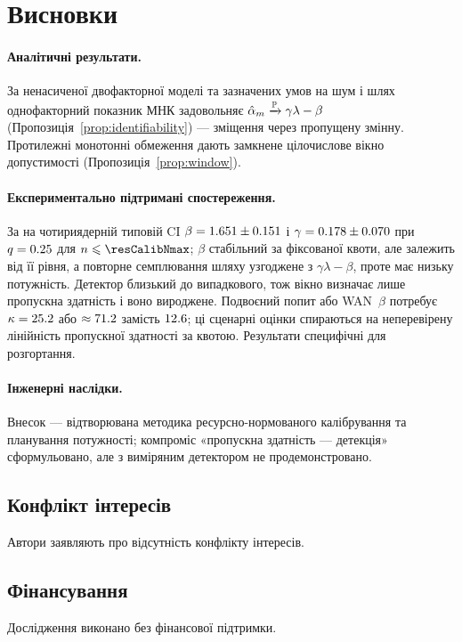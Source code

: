 \section{Висновки}
\label{sec:conclusions}

\paragraph{Аналітичні результати.}
За ненасиченої двофакторної моделі та зазначених умов на шум і шлях
однофакторний показник МНК задовольняє
$\hat{\alpha}_{m}\xrightarrow{\mathbb{P}}\gamma\lambda-\beta$
(Пропозиція~\ref{prop:identifiability}) --- зміщення через пропущену змінну.
Протилежні монотонні обмеження дають замкнене цілочислове вікно допустимості
(Пропозиція~\ref{prop:window}).

\paragraph{Експериментально підтримані спостереження.}
За \RNM{} на чотириядерній типовій CI $\beta=1.651\pm0.151$ і
$\gamma=0.178\pm0.070$ при $q=0.25$ для $\n\le\resCalibNmax$; $\beta$
стабільний за
фіксованої квоти, але залежить від її рівня, а повторне семплювання шляху
узгоджене з $\gamma\lambda-\beta$, проте має низьку потужність. Детектор
близький до випадкового, тож вікно визначає лише пропускна здатність і воно
вироджене. Подвоєний попит або WAN~$\beta$ потребує
$\kappa=25.2$ або $\approx71.2$ замість
$12.6$; ці сценарні оцінки спираються на неперевірену лінійність
пропускної здатності за квотою. Результати специфічні для розгортання.

\paragraph{Інженерні наслідки.}
Внесок --- відтворювана методика ресурсно-нормованого калібрування та
планування потужності; компроміс «пропускна здатність --- детекція»
сформульовано, але з виміряним детектором не продемонстровано.

\subsection*{Конфлікт інтересів}
Автори заявляють про відсутність конфлікту інтересів.

\subsection*{Фінансування}
Дослідження виконано без фінансової підтримки.

